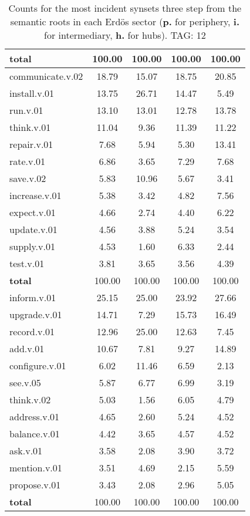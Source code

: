 \begin{table}[h!]
\begin{center}
\begin{tabular}{| l || c | c | c | c |}
{{\bf total}} & 100.00  & 100.00  & 100.00  & 100.00 \\\hline\hline\hline
communicate.v.02 & 18.79  & 15.07  & 18.75  & 20.85 \\\hline
install.v.01 & 13.75  & 26.71  & 14.47  & 5.49 \\\hline
run.v.01 & 13.10  & 13.01  & 12.78  & 13.78 \\\hline
think.v.01 & 11.04  & 9.36  & 11.39  & 11.22 \\\hline
repair.v.01 & 7.68  & 5.94  & 5.30  & 13.41 \\\hline
rate.v.01 & 6.86  & 3.65  & 7.29  & 7.68 \\\hline
save.v.02 & 5.83  & 10.96  & 5.67  & 3.41 \\\hline
increase.v.01 & 5.38  & 3.42  & 4.82  & 7.56 \\\hline
expect.v.01 & 4.66  & 2.74  & 4.40  & 6.22 \\\hline
update.v.01 & 4.56  & 3.88  & 5.24  & 3.54 \\\hline
supply.v.01 & 4.53  & 1.60  & 6.33  & 2.44 \\\hline
test.v.01 & 3.81  & 3.65  & 3.56  & 4.39 \\\hline\hline
{{\bf total}} & 100.00  & 100.00  & 100.00  & 100.00 \\\hline\hline\hline
inform.v.01 & 25.15  & 25.00  & 23.92  & 27.66 \\\hline
upgrade.v.01 & 14.71  & 7.29  & 15.73  & 16.49 \\\hline
record.v.01 & 12.96  & 25.00  & 12.63  & 7.45 \\\hline
add.v.01 & 10.67  & 7.81  & 9.27  & 14.89 \\\hline
configure.v.01 & 6.02  & 11.46  & 6.59  & 2.13 \\\hline
see.v.05 & 5.87  & 6.77  & 6.99  & 3.19 \\\hline
think.v.02 & 5.03  & 1.56  & 6.05  & 4.79 \\\hline
address.v.01 & 4.65  & 2.60  & 5.24  & 4.52 \\\hline
balance.v.01 & 4.42  & 3.65  & 4.57  & 4.52 \\\hline
ask.v.01 & 3.58  & 2.08  & 3.90  & 3.72 \\\hline
mention.v.01 & 3.51  & 4.69  & 2.15  & 5.59 \\\hline
propose.v.01 & 3.43  & 2.08  & 2.96  & 5.05 \\\hline\hline
{{\bf total}} & 100.00  & 100.00  & 100.00  & 100.00 \\\hline
\end{tabular}
\caption{Counts for the most incident synsets three step from the semantic roots in each Erd\"os sector ({\bf p.} for periphery, {\bf i.} for intermediary, {\bf h.} for hubs). TAG: 12}
\end{center}
\end{table}